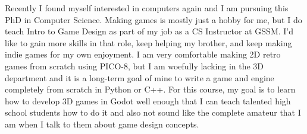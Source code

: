 \documentclass[12pt]{article}
\begin{document}
\noindent Recently I found myself interested in computers again and I am pursuing this PhD in Computer Science. Making games is mostly just a hobby for me, but I do teach Intro to Game Design as part of my job as a CS Instructor at GSSM. I'd like to gain more skills in that role, keep helping my brother, and keep making indie games for my own enjoyment. I am very comfortable making 2D retro games from scratch using PICO-8, but I am woefully lacking in the 3D department and it is a long-term goal of mine to write a game and engine completely from scratch in Python or C++. For this course, my goal is to learn how to develop 3D games in Godot well enough that I can teach talented high school students how to do it and also not sound like the complete amateur that I am when I talk to them about game design concepts. 
\end{document}
